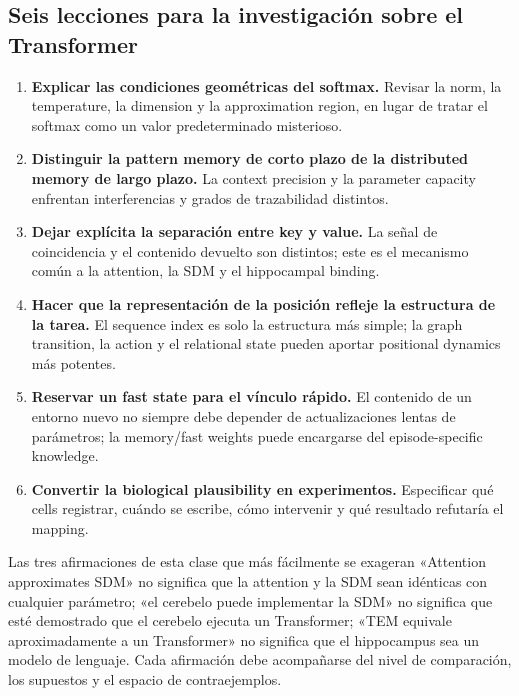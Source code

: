 \documentclass[a4paper]{article}
\begin{document}
\subsection{Seis lecciones para la investigación sobre el Transformer}

\begin{enumerate}
  \item \textbf{Explicar las condiciones geométricas del softmax.} Revisar la norm, la temperature, la dimension y la approximation region, en lugar de tratar el softmax como un valor predeterminado misterioso.
  \item \textbf{Distinguir la pattern memory de corto plazo de la distributed memory de largo plazo.} La context precision y la parameter capacity enfrentan interferencias y grados de trazabilidad distintos.
  \item \textbf{Dejar explícita la separación entre key y value.} La señal de coincidencia y el contenido devuelto son distintos; este es el mecanismo común a la attention, la SDM y el hippocampal binding.
  \item \textbf{Hacer que la representación de la posición refleje la estructura de la tarea.} El sequence index es solo la estructura más simple; la graph transition, la action y el relational state pueden aportar positional dynamics más potentes.
  \item \textbf{Reservar un fast state para el vínculo rápido.} El contenido de un entorno nuevo no siempre debe depender de actualizaciones lentas de parámetros; la memory/fast weights puede encargarse del episode-specific knowledge.
  \item \textbf{Convertir la biological plausibility en experimentos.} Especificar qué cells registrar, cuándo se escribe, cómo intervenir y qué resultado refutaría el mapping.
\end{enumerate}

\begin{warningbox}{Las tres afirmaciones de esta clase que más fácilmente se exageran}
«Attention approximates SDM» no significa que la attention y la SDM sean idénticas con cualquier parámetro; «el cerebelo puede implementar la SDM» no significa que esté demostrado que el cerebelo ejecuta un Transformer; «TEM equivale aproximadamente a un Transformer» no significa que el hippocampus sea un modelo de lenguaje. Cada afirmación debe acompañarse del nivel de comparación, los supuestos y el espacio de contraejemplos.
\end{warningbox}
\end{document}
